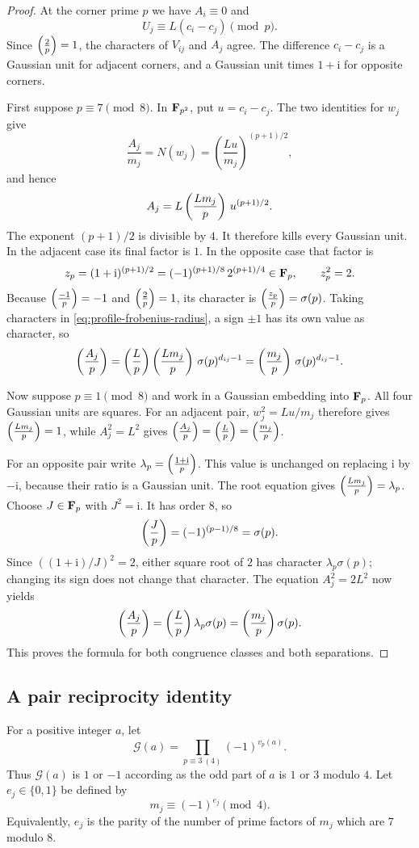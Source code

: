 \begin{proof}
At the corner prime $p$ we have $A_i\equiv0$ and
\[
 U_j\equiv L(c_i-c_j)\pmod p.
\]
Since $\left(\frac{2}{p}\right)=1$, the characters of $V_{ij}$ and $A_j$ agree.
The difference $c_i-c_j$ is a Gaussian unit for adjacent corners,
and a Gaussian unit times $1+\mathrm i$ for opposite corners.

First suppose $p\equiv7\pmod8$.  In $\mathbf F_{p^2}$, put
$u=c_i-c_j$.  The two identities for $w_j$ give
\[
 \frac{A_j}{m_j}
  =N(w_j)
  =\left(\frac{Lu}{m_j}\right)^{(p+1)/2},
\]
and hence
\begin{equation}\label{eq:profile-frobenius-radius}
 A_j=L\left(\frac{Lm_j}{p}\right)\,u^{(p+1)/2}.
\end{equation}
The exponent $(p+1)/2$ is divisible by $4$.  It therefore kills every
Gaussian unit.  In the adjacent case its final factor is $1$.
In the opposite case that factor is
\[
 z_p=(1+\mathrm i)^{(p+1)/2}
     =(-1)^{(p+1)/8}\,2^{(p+1)/4}\in\mathbf F_p,
 \qquad z_p^2=2.
\]
Because $\left(\frac{-1}{p}\right)=-1$ and $\left(\frac{2}{p}\right)=1$, its character is
$\left(\frac{z_p}{p}\right)=\sigma(p)$.  Taking characters in
\eqref{eq:profile-frobenius-radius}, a sign $\pm1$ has its own value
as character, so
\[
 \left(\frac{A_j}{p}\right)
 =\left(\frac{L}{p}\right)\left(\frac{Lm_j}{p}\right)\,\sigma(p)^{d_{ij}-1}
 =\left(\frac{m_j}{p}\right)\,\sigma(p)^{d_{ij}-1}.
\]

Now suppose $p\equiv1\pmod8$ and work in a Gaussian embedding into
$\mathbf F_p$.  All four Gaussian units are squares.  For an adjacent pair,
$w_j^2=Lu/m_j$ therefore gives $\left(\frac{Lm_j}{p}\right)=1$, while
$A_j^2=L^2$ gives $\left(\frac{A_j}{p}\right)=\left(\frac{L}{p}\right)=\left(\frac{m_j}{p}\right)$.

For an opposite pair write
$\lambda_p=\left(\frac{1+\mathrm i}{p}\right)$.  This value is unchanged on replacing
$\mathrm i$ by $-\mathrm i$, because their ratio is a Gaussian unit.
The root equation gives $\left(\frac{Lm_j}{p}\right)=\lambda_p$.  Choose
$J\in\mathbf F_p$ with $J^2=\mathrm i$.  It has order $8$, so
\[
 \left(\frac{J}{p}\right)=(-1)^{(p-1)/8}=\sigma(p).
\]
Since $((1+\mathrm i)/J)^2=2$, either square root of $2$ has character
$\lambda_p\sigma(p)$; changing its sign does not change that
character.  The equation $A_j^2=2L^2$ now yields
\[
 \left(\frac{A_j}{p}\right)
  =\left(\frac{L}{p}\right)\lambda_p\sigma(p)
  =\left(\frac{m_j}{p}\right)\sigma(p).
\]
This proves the formula for both congruence classes and both separations.
\end{proof}

\subsection{A pair reciprocity identity}

For a positive integer $a$, let
\begin{equation}\label{eq:profile-G}
 \mathcal G(a)=\prod_{p\equiv3\ (4)}(-1)^{v_p(a)}.
\end{equation}
Thus $\mathcal G(a)$ is $1$ or $-1$ according as the odd part of $a$
is $1$ or $3$ modulo $4$.  Let $e_j\in\{0,1\}$ be defined by
\begin{equation}\label{eq:profile-e}
 m_j\equiv(-1)^{e_j}\pmod4.
\end{equation}
Equivalently, $e_j$ is the parity of the number of prime factors of
$m_j$ which are $7$ modulo $8$.

